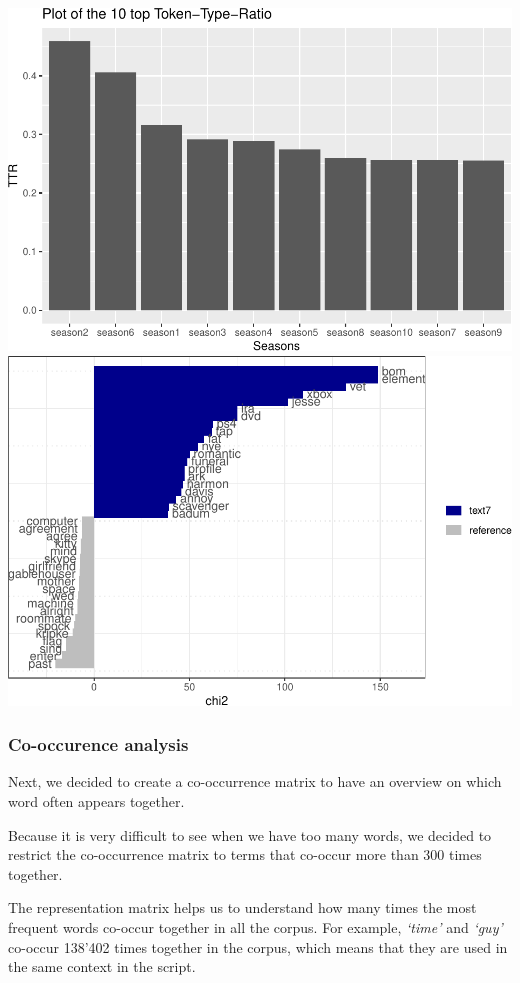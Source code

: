 \documentclass[
]{article}
\begin{document}
\includegraphics{report_files/figure-latex/unnamed-chunk-21-1.pdf}
\includegraphics{report_files/figure-latex/unnamed-chunk-21-2.pdf}

\hypertarget{co-occurence-analysis}{%
\subsubsection{Co-occurence analysis}\label{co-occurence-analysis}}

Next, we decided to create a co-occurrence matrix to have an overview on
which word often appears together.

Because it is very difficult to see when we have too many words, we
decided to restrict the co-occurrence matrix to terms that co-occur more
than 300 times together.

The representation matrix helps us to understand how many times the most
frequent words co-occur together in all the corpus. For example,
\emph{`time'} and \emph{`guy'} co-occur 138'402 times together in the
corpus, which means that they are used in the same context in the
script.
\end{document}
